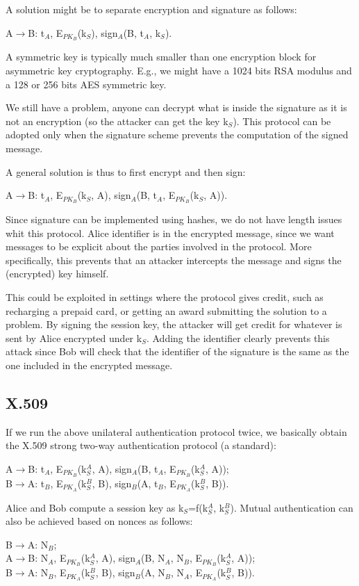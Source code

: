 \documentclass[a4paper, 12pt]{report}
\begin{document}
A solution might be to separate encryption and signature as follows:
\begin{center}
	A$\rightarrow$B: t$_A$, E$_{PK_B}$(k$_S$), sign$_A$(B, t$_A$, k$_S$).
\end{center}
A symmetric key is typically much smaller than one encryption block for asymmetric key cryptography. E.g., we might have a 1024 bits RSA modulus and a 128 or 256 bits AES symmetric key.

We still have a problem, anyone can decrypt what is inside the signature as it is not an encryption (so the attacker can get the key k$_S$). This protocol can be adopted only when the signature scheme prevents the computation of the signed message.

A general solution is thus to first encrypt and then sign:
\begin{center}
	A$\rightarrow$B: t$_A$, E$_{PK_B}$(k$_S$, A), sign$_A$(B, t$_A$, E$_{PK_B}$(k$_S$, A)).
\end{center}
Since signature can be implemented using hashes, we do not have length issues whit this protocol. Alice identifier is in the encrypted message, since we want messages to be explicit about the parties involved in the protocol. More specifically, this prevents that an attacker intercepts the message and signs the (encrypted) key himself.

This could be exploited in settings where the protocol gives credit, such as recharging a prepaid card, or getting an award submitting the solution to a problem. By signing the session key, the attacker will get credit for whatever is sent by Alice encrypted under k$_S$. Adding the identifier clearly prevents this attack since Bob will check that the identifier of the signature is the same as the one included in the encrypted message.

\subsection*{X.509}
If we run the above unilateral authentication protocol twice, we basically obtain the X.509 strong two-way authentication protocol (a standard):
\begin{center}
	A$\rightarrow$B: t$_A$, E$_{PK_B}$(k$^A_S$, A), sign$_A$(B, t$_A$, E$_{PK_B}$(k$^A_S$, A));\\
	B$\rightarrow$A: t$_B$, E$_{PK_A}$(k$^B_S$, B), sign$_B$(A, t$_B$, E$_{PK_A}$(k$^B_S$, B)).
\end{center}
Alice and Bob compute a session key as k$_S$=f(k$^A_S$, k$^B_S$). Mutual authentication can also be achieved based on nonces as follows:
\begin{center}
	B$\rightarrow$A: N$_B$;\\
	A$\rightarrow$B: N$_A$, E$_{PK_B}$(k$^A_S$, A), sign$_A$(B, N$_A$, N$_B$, E$_{PK_B}$(k$^A_S$, A));\\
	B$\rightarrow$A: N$_B$, E$_{PK_A}$(k$^B_S$, B), sign$_B$(A, N$_B$, N$_A$, E$_{PK_A}$(k$^B_S$, B)).
\end{center}
\end{document}

